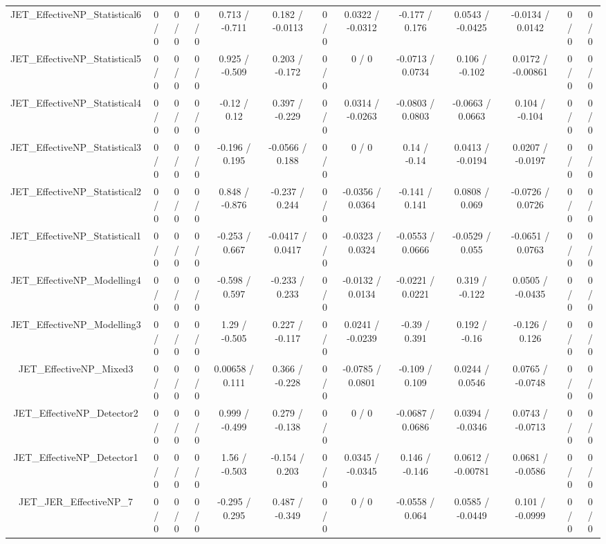\documentclass[10pt]{article}
\begin{document}
\begin{table}[htbp]
\begin{center}
\begin{tabular}{|c|c|c|c|c|c|c|c|c|c|c|c|c|}
  JET_EffectiveNP_Statistical6 & 0 / 0 & 0 / 0 & 0 / 0 & 0.713 / -0.711 & 0.182 / -0.0113 & 0 / 0 & 0.0322 / -0.0312 & -0.177 / 0.176 & 0.0543 / -0.0425 & -0.0134 / 0.0142 & 0 / 0 & 0 / 0 \\ 
  JET_EffectiveNP_Statistical5 & 0 / 0 & 0 / 0 & 0 / 0 & 0.925 / -0.509 & 0.203 / -0.172 & 0 / 0 & 0 / 0 & -0.0713 / 0.0734 & 0.106 / -0.102 & 0.0172 / -0.00861 & 0 / 0 & 0 / 0 \\ 
  JET_EffectiveNP_Statistical4 & 0 / 0 & 0 / 0 & 0 / 0 & -0.12 / 0.12 & 0.397 / -0.229 & 0 / 0 & 0.0314 / -0.0263 & -0.0803 / 0.0803 & -0.0663 / 0.0663 & 0.104 / -0.104 & 0 / 0 & 0 / 0 \\ 
  JET_EffectiveNP_Statistical3 & 0 / 0 & 0 / 0 & 0 / 0 & -0.196 / 0.195 & -0.0566 / 0.188 & 0 / 0 & 0 / 0 & 0.14 / -0.14 & 0.0413 / -0.0194 & 0.0207 / -0.0197 & 0 / 0 & 0 / 0 \\ 
  JET_EffectiveNP_Statistical2 & 0 / 0 & 0 / 0 & 0 / 0 & 0.848 / -0.876 & -0.237 / 0.244 & 0 / 0 & -0.0356 / 0.0364 & -0.141 / 0.141 & 0.0808 / 0.069 & -0.0726 / 0.0726 & 0 / 0 & 0 / 0 \\ 
  JET_EffectiveNP_Statistical1 & 0 / 0 & 0 / 0 & 0 / 0 & -0.253 / 0.667 & -0.0417 / 0.0417 & 0 / 0 & -0.0323 / 0.0324 & -0.0553 / 0.0666 & -0.0529 / 0.055 & -0.0651 / 0.0763 & 0 / 0 & 0 / 0 \\ 
  JET_EffectiveNP_Modelling4 & 0 / 0 & 0 / 0 & 0 / 0 & -0.598 / 0.597 & -0.233 / 0.233 & 0 / 0 & -0.0132 / 0.0134 & -0.0221 / 0.0221 & 0.319 / -0.122 & 0.0505 / -0.0435 & 0 / 0 & 0 / 0 \\ 
  JET_EffectiveNP_Modelling3 & 0 / 0 & 0 / 0 & 0 / 0 & 1.29 / -0.505 & 0.227 / -0.117 & 0 / 0 & 0.0241 / -0.0239 & -0.39 / 0.391 & 0.192 / -0.16 & -0.126 / 0.126 & 0 / 0 & 0 / 0 \\ 
  JET_EffectiveNP_Mixed3 & 0 / 0 & 0 / 0 & 0 / 0 & 0.00658 / 0.111 & 0.366 / -0.228 & 0 / 0 & -0.0785 / 0.0801 & -0.109 / 0.109 & 0.0244 / 0.0546 & 0.0765 / -0.0748 & 0 / 0 & 0 / 0 \\ 
  JET_EffectiveNP_Detector2 & 0 / 0 & 0 / 0 & 0 / 0 & 0.999 / -0.499 & 0.279 / -0.138 & 0 / 0 & 0 / 0 & -0.0687 / 0.0686 & 0.0394 / -0.0346 & 0.0743 / -0.0713 & 0 / 0 & 0 / 0 \\ 
  JET_EffectiveNP_Detector1 & 0 / 0 & 0 / 0 & 0 / 0 & 1.56 / -0.503 & -0.154 / 0.203 & 0 / 0 & 0.0345 / -0.0345 & 0.146 / -0.146 & 0.0612 / -0.00781 & 0.0681 / -0.0586 & 0 / 0 & 0 / 0 \\ 
  JET_JER_EffectiveNP_7 & 0 / 0 & 0 / 0 & 0 / 0 & -0.295 / 0.295 & 0.487 / -0.349 & 0 / 0 & 0 / 0 & -0.0558 / 0.064 & 0.0585 / -0.0449 & 0.101 / -0.0999 & 0 / 0 & 0 / 0 \\ 

\end{tabular}
\end{center}
\end{table}
\end{document}
